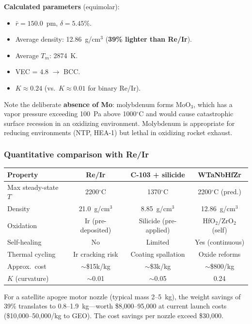 \documentclass[12pt,letterpaper]{article}
\theoremstyle{definition}
\begin{document}
\textbf{Calculated parameters} (equimolar):
\begin{itemize}
  \item $\bar{r} = 150.0$~pm, \quad $\delta = 5.45\%$.
  \item Average density: 12.86~g/cm$^3$ \quad (\textbf{39\% lighter than Re/Ir}).
  \item Average $T_m$: 2874~K.
  \item VEC = 4.8 $\to$ BCC.
  \item $K \approx 0.24$ \quad (vs.\ $K \approx 0.01$ for binary Re/Ir).
\end{itemize}

Note the deliberate \textbf{absence of Mo}: molybdenum forms MoO$_3$, which has a vapor pressure exceeding 100~Pa above 1000$^\circ$C and would cause catastrophic surface recession in an oxidizing environment.  Molybdenum is appropriate for reducing environments (NTP, HEA-1) but lethal in oxidizing rocket exhaust.

\subsubsection{Quantitative comparison with Re/Ir}

\begin{center}
\small
\begin{tabular}{@{}lccc@{}}
\toprule
Property & Re/Ir & C-103 + silicide & WTaNbHfZr \\
\midrule
Max steady-state $T$ & 2200$^\circ$C & 1370$^\circ$C & 2200$^\circ$C (pred.) \\
Density & 21.0~g/cm$^3$ & 8.85~g/cm$^3$ & 12.86~g/cm$^3$ \\
Oxidation & Ir (pre-deposited) & Silicide (pre-applied) & HfO$_2$/ZrO$_2$ (self) \\
Self-healing & No & Limited & Yes (continuous) \\
Thermal cycling & Ir cracking risk & Coating spallation & Oxide reforms \\
Approx.\ cost & $\sim$\$15k/kg & $\sim$\$3k/kg & $\sim$\$800/kg \\
$K$ (curvature) & $\sim$0.01 & $\sim$0.05 & 0.24 \\
\bottomrule
\end{tabular}
\normalsize
\end{center}

For a satellite apogee motor nozzle (typical mass 2--5~kg), the weight savings of 39\% translates to 0.8--1.9~kg---worth \$8,000--95,000 at current launch costs (\$10,000--50,000/kg to GEO).  The cost savings per nozzle exceed \$30,000.
\end{document}
